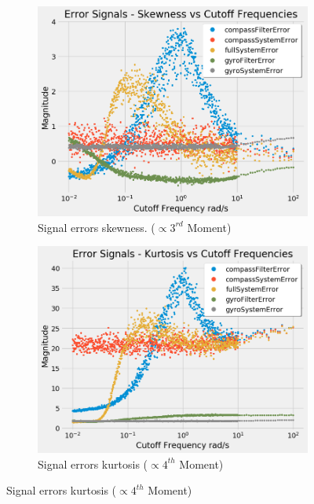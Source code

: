 \begin{figure}[H]
\begin{subfigure}{.5\textwidth}
\end{subfigure}
\begin{subfigure}{.5\textwidth}
  \centering
  \includegraphics[width=\linewidth, height=\paperheight/5]{img/iterable/errorsSignals/errorskewnessSignals.png}  
  \caption{Signal errors skewness. ($\propto3^{rd}$ Moment)}
  \label{fig:error_skewness}
\end{subfigure}
\begin{subfigure}{.5\textwidth}
  \centering
  \includegraphics[width=\linewidth, height=\paperheight/5]{img/iterable/errorsSignals/errorkurtosisSignals.png}  
  \caption{Signal errors kurtosis ($\propto4^{th}$ Moment)}
  \label{fig:error_kurtosis}

\end{subfigure}
\end{figure}
